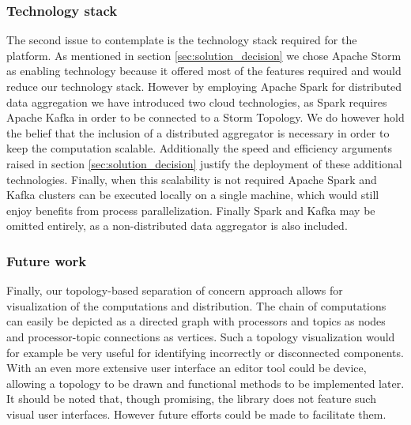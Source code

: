 \subsubsection*{Technology stack}
The second issue to contemplate is the technology stack required for the platform. As mentioned in section \ref{sec:solution_decision} we chose Apache Storm as enabling technology because it offered most of the features required and would reduce our technology stack. However by employing Apache Spark for distributed data aggregation we have introduced two cloud technologies, as Spark requires Apache Kafka in order to be connected to a Storm Topology. We do however hold the belief that the inclusion of a distributed aggregator is necessary in order to keep the computation scalable. Additionally the speed and efficiency arguments raised in section \ref{sec:solution_decision} justify the deployment of these additional technologies. Finally, when this scalability is not required Apache Spark and Kafka clusters can be executed locally on a single machine, which would still enjoy benefits from process parallelization. Finally Spark and Kafka may be omitted entirely, as a non-distributed data aggregator is also included.

\subsubsection*{Future work}
Finally, our topology-based separation of concern approach allows for visualization of the computations and distribution. The chain of computations can easily be depicted as a directed graph with processors and topics as nodes and processor-topic connections as vertices. Such a topology visualization would for example be very useful for identifying incorrectly or disconnected components. With an even more extensive user interface an editor tool could be device, allowing a topology to be drawn and functional methods to be implemented later. It should be noted that, though promising, the library does not feature such visual user interfaces. However future efforts could be made to facilitate them.



	







